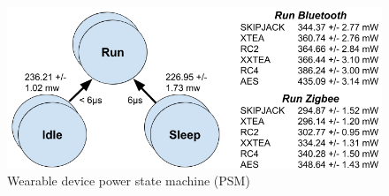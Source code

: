 \documentclass[journal]{IEEEtran}
\begin{document}
\begin{figure}[tbh]
  \centering
  \includegraphics[scale=0.3]{Figures/C_PSM_geral.png}
  \caption{Wearable device power state machine (PSM)}
  \label{fig:PSM_geral}
  \vspace{-0.2cm}
\end{figure}
\end{document}
